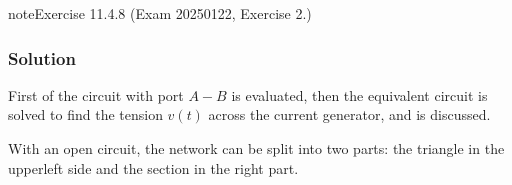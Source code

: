 \documentclass[letterpaper,10pt,english]{jupyterBook}
\begin{document}
\begin{sphinxadmonition}{note}{Exercise 11.4.8 (Exam 2025\sphinxhyphen{}01\sphinxhyphen{}22, Exercise 2.)}



\begin{figure}[htbp]
\centering

\noindent{}
\end{figure}
\subsubsection*{Solution}

\sphinxAtStartPar
First {\hyperref[\detokenize{ch/electrical-engineering-networks-linear:classical-electromagnetism-electrical-engineering-newtork-analysis-thevenin-1-port}]{}} of the circuit with port \(A-B\) is evaluated, then the equivalent circuit is solved to find the tension \(v(t)\) across the current generator, and {\hyperref[\detokenize{ch/electrical-engineering-networks-harmonic:classical-electromagnetism-electrical-engineering-newtork-analysis-harmonic-power}]{}} is discussed.

\sphinxAtStartPar
{} With an open circuit, the network can be split into two parts: the triangle in the upper\sphinxhyphen{}left side and the section in the right part.


\end{sphinxadmonition}
\end{document}
